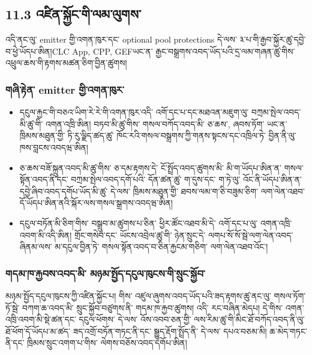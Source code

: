 \documentclass[11pt]{article}
\begin{document}
\subsection*{11.3 འཛིན་སྐྱོང་གི་ལམ་ལུགས་}

འདི་ནང་ལུ་ emitter གྱི་འགན་ཁུར་དང་ optional pool protections དེ་ལས་ ༣་པ་གི་རྒྱབ་སྐྱོར་ཚུ་དབྱེ་བ་ཕྱེ་ཡོདཔ་ཨིན།CLC App, CPP, GEFཡང་ན་ རྒྱང་བསྒྲགས་འབད་ཡོད་པའི་དྲ་ལམ་གཞན་ཚུ་གིས་ འཕྲུལ་ཆས་གི་རྟགས་མཚན་ཅིག་བྱིན་ཚུགས།

\subsubsection*{གཞི་རྟེན་ emitter གྱི་འགན་ཁུར་}

\begin{itemize}[leftmargin=*]
\item དངུལ་རྐྱང་གི་བཅའ་ཡིག་རེ་རེ་གི་འགན་ཁུར་འདི་ འགོ་དང་པ་དང་མཐའན་མཇུག་ལུ་ བཀྲམ་སྤེལ་འབད་མི་ཚུ་གི་ འགན་འཁྲི་ཨིན། བཏབ་མི་ཚུ་གིས་ གསལ་བཀོད་འབད་མི་ ཅ་ཆས་, ཞབས་ཏོག་ ཡང་ན་ ཁྲིམས་མཐུན་གྱི་ ཏི་རུ་ལྗིད་ཚད་ཚུ་ ཁོང་རའི་གསལ་བསྒྲགས་ཀྱི་གནས་སྟངས་དང་འཁྲིལ་ཏེ་ བྱིན་ནི་ལུ་ ཁས་བླངས་འབདཝ་ཨིན།
\item ཅ་ཆས་བཟོ་སྐྲུན་འབད་མི་ཚུ་གིས་ ཅ་དམ་རྟགས་དེ་ ངོ་སྤྲོད་འབད་ཚུགས་མི་ མི་ག་ཡོདཔ་ཨིན་ན་ གསལ་སྟོན་འབད་ནི་དང་ བཀྲམ་སྤེལ་འབད་དགོ་པའི་ དོན་ཚན་ཚུ་ ག་དུས་དང་ ག་ཏེ་ལུ་ འོང་ནི་ཡོདཔ་ཨིན་ན་ དབྱེ་ཞིབ་འབད་དགོཔ་ཡོད་མི་ཚུ་ དེ་ལས་ ཁྲིམས་མཐུན་གྱི་ ཐབས་ལམ་ག་ཅི་བཟུམ་ཅིག་ ལག་ལེན་འཐབ་དོ་ཡོདཔ་ཨིན་ནའི་སྐོར་ལས་གསལ་སྒྲགས་འབདཝ་ཨིན།
\item དངུལ་བཏོན་མི་ཅིག་གིས་ བསྒྲུབ་མ་ཚུགས་པ་ཅིན་ ཕྱིར་ཚོང་འཐབ་མི་དེ་ འགོ་དང་པ་ལུ་ འགན་འཁྲི་འབག་མི་འདི་ཨིན། གྲོང་གསེབ་དང་ ཡོངས་འབྲེལ་ཚུ་གི་ ཉེན་སྲུང་དེ་ ལགཔ་སོ་སོ་སྦེ་ལག་ལེན་འབད་ཞིནམ་ལས་ མ་དངུལ་བྱིན་ཏེ་ གསལ་སྟོན་འབད་བ་ཅིན་རྐྱངམ་གཅིག་ ལག་ལེན་འཐབ་འོང་།
\end{itemize}
\subsubsection*{གདམ་ཁ་རྐྱབས་འབད་མི་ མཉམ་སྤྱོད་དངུལ་ཁུངས་གི་སྲུང་སྐྱོབ་}

མཉམ་སྤྱོད་དངུལ་ཁུངས་ཀྱི་འཛིན་སྐྱོང་པ། གིས་ འཛུལ་ཞུགས་འབད་ཡོད་པའི་ཟད་རྟགས་ཚུ་ནང་ལུ་ གསལ་ཏོག་ཏོ་སྦེ་ བཀག་ཆ་འབད་མི་ སྲུང་སྐྱོབ་བཙུགས་ནི་ གདམ་ཁ་རྐྱབ་ཚུགས། འདི་ རང་བཞིན་མེདཔ། དེ་གིས་ འགན་འཁྲི་འབག་མི་སྡེ་ཚན་དང་ དངུལ་ཕོགས་ དེ་ལས་ འོས་འབབ་ཅན་གྱི་ ལས་རིམ་ཚུ་གི་མིང་ཐོ་བཀོད་འབད་ནི་ལུ་ ཐོ་ཕོག་དོ་ཡོདཔ་མ་ཚད་ ཟད་འགྲོ་བཏོན་གཏང་ནི་དང་ སྒྱུད་རྡོག་སྤྲོད་ནི་ དེ་ལས་ དཔའ་བཅམ་མི། ཆ་མེད་གཏང་ནི་དང་ ཁྲིམས་སྲུང་འགག་པ་གིས་ ལེགས་བཅོས་འབད་དགོཔ་ཨིན།
\end{document}
